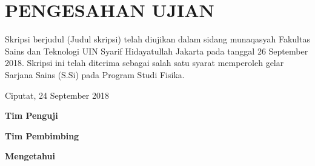 \chapter{PENGESAHAN UJIAN}
Skripsi berjudul (Judul skripsi) telah diujikan dalam sidang munaqasyah Fakultas Sains dan Teknologi UIN Syarif Hidayatullah Jakarta pada tanggal 26 September 2018. Skripsi ini telah diterima sebagai salah satu syarat memperoleh gelar Sarjana Sains (S.Si) pada Program Studi Fisika.

\begin{flushright}
    Ciputat, 24 September 2018
\end{flushright}

\centerline{\textbf{Tim Penguji}}


\centerline{\textbf{Tim Pembimbing}}


\centerline{\textbf{Mengetahui}}

